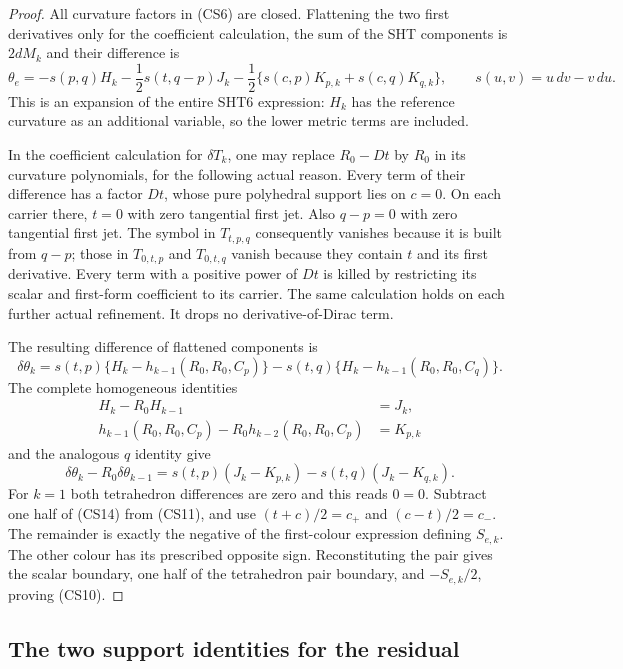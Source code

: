 \begin{proof}
All curvature factors in (CS6) are closed.  Flattening the two
first derivatives only for the coefficient calculation, the sum
of the SHT components is $2dM_k$ and their difference is
\[
 \theta_e=-s(p,q)H_k-\frac12s(t,q-p)J_k
               -\frac12\{s(c,p)K_{p,k}+s(c,q)K_{q,k}\},
 \qquad s(u,v)=u\,dv-v\,du.
 \tag{CS11}
\]
This is an expansion of the entire SHT6 expression: $H_k$ has the
reference curvature as an additional variable, so the lower metric
terms are included.

In the coefficient calculation for $\delta T_k$, one may replace
$R_0-Dt$ by $R_0$ in its curvature polynomials, for the following
actual reason.  Every term of their difference has a factor $Dt$,
whose pure polyhedral support lies on $c=0$.  On each carrier there,
$t=0$ with zero tangential first jet.  Also $q-p=0$ with zero
tangential first jet.  The symbol in $T_{t,p,q}$ consequently
vanishes because it is built from $q-p$; those in $T_{0,t,p}$ and
$T_{0,t,q}$ vanish because they contain $t$ and its first derivative.
Every term with a positive power of $Dt$ is killed by restricting
its scalar and first-form coefficient to its carrier.  The same
calculation holds on each further actual refinement.  It drops no
derivative-of-Dirac term.

The resulting difference of flattened components is
\[
 \delta\theta_k=s(t,p)\{H_k-h_{k-1}(R_0,R_0,C_p)\}
             -s(t,q)\{H_k-h_{k-1}(R_0,R_0,C_q)\}.
 \tag{CS12}
\]
The complete homogeneous identities
\[
 \begin{split}
 H_k-R_0H_{k-1}&=J_k,\\
 h_{k-1}(R_0,R_0,C_p)
     -R_0h_{k-2}(R_0,R_0,C_p)&=K_{p,k}
 \end{split}
 \tag{CS13}
\]
and the analogous $q$ identity give
\[
 \delta\theta_k-R_0\delta\theta_{k-1}
       =s(t,p)(J_k-K_{p,k})-s(t,q)(J_k-K_{q,k}).
 \tag{CS14}
\]
For $k=1$ both tetrahedron differences are zero and this reads
$0=0$.  Subtract one half of (CS14) from (CS11), and use
$(t+c)/2=c_+$ and $(c-t)/2=c_-$.  The remainder is exactly
the negative of the first-colour expression defining $S_{e,k}$.
The other colour has its prescribed opposite sign.  Reconstituting
the pair gives the scalar boundary, one half of the tetrahedron
pair boundary, and $-S_{e,k}/2$, proving (CS10).
\end{proof}

\subsection{The two support identities for the residual}

